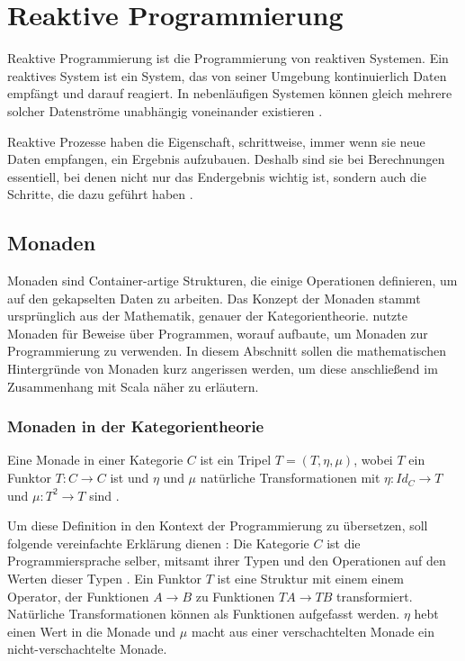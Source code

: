 
\chapter{Reaktive Programmierung} %
\label{cha:reaktive_programmierung}

Reaktive Programmierung ist die Programmierung von reaktiven Systemen.
Ein reaktives System ist ein System, das von seiner Umgebung kontinuierlich Daten empfängt und darauf reagiert.
In nebenläufigen Systemen können gleich mehrere solcher Datenströme unabhängig voneinander existieren \cite[vgl.][S.~1]{reactive_programming}.

Reaktive Prozesse haben die Eigenschaft, schrittweise, immer wenn sie neue Daten empfangen, ein Ergebnis aufzubauen.
Deshalb sind sie bei Berechnungen essentiell, bei denen nicht nur das Endergebnis wichtig ist, sondern auch die Schritte, die dazu geführt haben \cite[vgl.][S.~2]{reactive_programming1}.

\section{Monaden} %
\label{sec:monaden}

Monaden sind Container-artige Strukturen, die einige Operationen definieren, um auf den gekapselten Daten zu arbeiten.
Das Konzept der Monaden stammt ursprünglich aus der Mathematik, genauer der Kategorientheorie.
\citealt{monads_program_structure} nutzte Monaden für Beweise über Programmen, worauf \citealt{monads_programming} aufbaute, um Monaden zur Programmierung zu verwenden.
In diesem Abschnitt sollen die mathematischen Hintergründe von Monaden kurz angerissen werden, um diese anschließend im Zusammenhang mit Scala näher zu erläutern.

\subsection{Monaden in der Kategorientheorie} %
\label{sub:monaden_in_der_kategorientheorie}

Eine Monade in einer Kategorie $C$ ist ein Tripel $T = (T, \eta, \mu)$, wobei $T$ ein Funktor $T: C \to C$ ist und $\eta$ und $\mu$ natürliche Transformationen mit $\eta: Id_C \to T$ und $\mu: T^2 \to T$ sind \citetext{vgl.~\citealp[S.~137]{monads_category_theory}, \citealp[S.~2]{monads_program_structure}}.

Um diese Definition in den Kontext der Programmierung zu übersetzen, soll folgende vereinfachte Erklärung dienen \cite[vgl.][S.~2--3]{monads_programming}:
Die Kategorie $C$ ist die Programmiersprache selber, mitsamt ihrer Typen und den Operationen auf den Werten dieser Typen \cite[vgl.][S.~6--8]{category_theory_and_programming}.
Ein Funktor $T$ ist eine Struktur mit einem einem Operator, der Funktionen $A \to B$ zu Funktionen $T A \to T B$ transformiert.
Natürliche Transformationen können als Funktionen aufgefasst werden.
$\eta$ hebt einen Wert in die Monade und $\mu$ macht aus einer verschachtelten Monade ein nicht-verschachtelte Monade.

